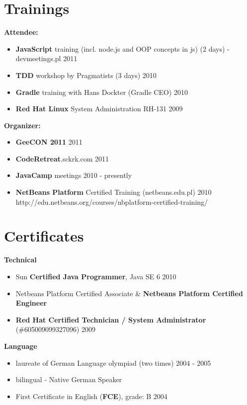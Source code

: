 \documentclass{res}
\begin{document}
\begin{resume}
\section{Trainings} 
{\bf Attendee:}
\begin{itemize}
 \item \textbf{JavaScript} training (incl. node.js and OOP concepts in js) (2 days) - devmeetings.pl \hfill 2011
 \item \textbf{TDD} workshop by Pragmatists (3 days) \hfill 2010
 \item \textbf{Gradle} training with Hans Dockter (Gradle CEO) \hfill 2010
 \item \textbf{Red Hat Linux} System Administration RH-131 \hfill 2009
\end{itemize}
{\bf Organizer:}
\begin{itemize}
 \item \textbf{GeeCON 2011} \hfill 2011
 \item \textbf{CodeRetreat}.sckrk.com \hfill 2011
 \item \textbf{JavaCamp} meetings \hfill 2010 - presently
 \item \textbf{NetBeans Platform} Certified Training (netbeans.edu.pl) \hfill 2010 \\
	http://edu.netbeans.org/courses/nbplatform-certified-training/ 
\end{itemize}

\section{Certificates} 
{\bf Technical}
\begin{itemize}
 \item Sun \textbf{Certified Java Programmer}, Java SE 6 \hfill 2010
 \item Netbeans Platform Certified Associate \& \textbf{Netbeans Platform Certified Engineer}
 \item \textbf{Red Hat Certified Technician / System
Administrator} (\#605009099327096) \hfill 2009\\
\end{itemize}
{\bf Language}
\begin{itemize}
 \item laureate of German Language olympiad (two times) \hfill 2004 - 2005
 \item bilingual - Native German Speaker
 \item First Certificate in English (\textbf{FCE}), grade: B \hfill 2004
\end{itemize}


\end{resume}
\end{document}
